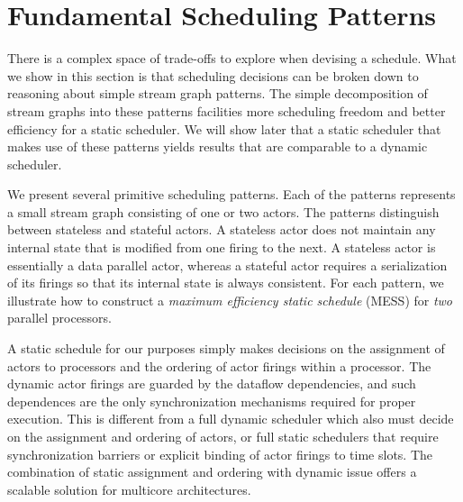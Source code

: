 \section{Fundamental Scheduling Patterns}


There is a complex space of trade-offs to explore when devising a
schedule. What we show in this section is that scheduling decisions
can be broken down to reasoning about simple stream graph
patterns. The simple decomposition of stream graphs into these
patterns facilities more scheduling freedom and better efficiency for
a static scheduler. We will show later that a static scheduler that
makes use of these patterns yields results that are comparable to
a dynamic scheduler.

We present several primitive scheduling patterns. Each of the patterns
represents a small stream graph consisting of one or two actors. The
patterns distinguish between stateless and stateful actors. A
stateless actor does not maintain any internal state that is modified
from one firing to the next. A stateless actor is essentially a data
parallel actor, whereas a stateful actor requires a serialization of
its firings so that its internal state is always consistent.  For each
pattern, we illustrate how to construct a {\it maximum efficiency
static schedule} (MESS) for {\it two} parallel processors.

A static schedule for our purposes simply makes decisions on the
assignment of actors to processors and the ordering of actor firings
within a processor. The dynamic actor firings are guarded by the
dataflow dependencies, and such dependences are the only
synchronization mechanisms required for proper execution.
This is different from a full dynamic scheduler which also must decide
on the assignment and ordering of actors, or full static schedulers
that require synchronization barriers or explicit binding of actor
firings to time slots. The combination of static
assignment and ordering with dynamic issue offers a scalable solution
for multicore architectures.


